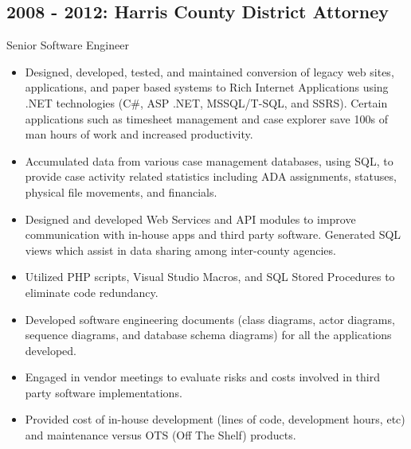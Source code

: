 \documentclass[11pt]{article}
\begin{document}
        \subsection*{2008 - 2012: Harris County District Attorney}
            Senior Software Engineer
            \begin{itemize}
                \item Designed, developed, tested, and maintained conversion of legacy web sites, applications, and paper based systems to Rich Internet Applications using .NET technologies (C\#, ASP .NET, MSSQL/T-SQL, and SSRS). Certain applications such as timesheet management and case explorer save 100s of man hours of work and increased productivity.
                \item Accumulated data from various case management databases, using SQL, to provide case activity related statistics including ADA assignments, statuses, physical file movements, and financials.
                \item Designed and developed Web Services and API modules to improve communication with in-house apps and third party software. Generated SQL views which assist in data sharing among inter-county agencies.
                \item Utilized PHP scripts, Visual Studio Macros, and SQL Stored Procedures to eliminate code redundancy.
                \item Developed software engineering documents (class diagrams, actor diagrams, sequence diagrams, and database schema diagrams) for all the applications developed.
                \item Engaged in vendor meetings to evaluate risks and costs involved in third party software implementations.
                \item Provided cost of in-house development (lines of code, development hours, etc) and maintenance versus OTS (Off The Shelf) products.
            \end{itemize}
\end{document}
